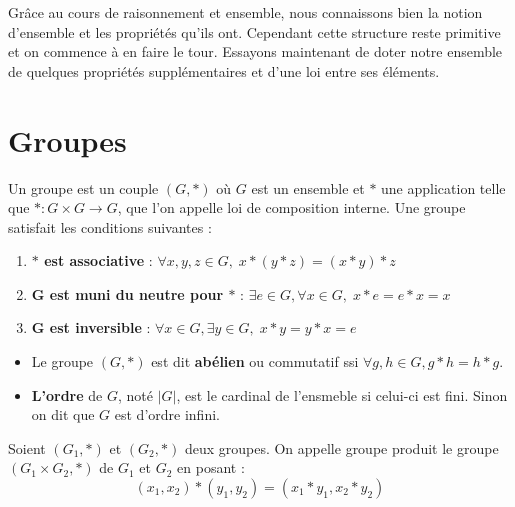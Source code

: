 
Grâce au cours de raisonnement et ensemble, nous connaissons bien la notion d'ensemble et les propriétés qu'ils ont. 
Cependant cette structure reste primitive et on commence à en faire le tour. 
Essayons maintenant de doter notre ensemble de quelques propriétés supplémentaires et d'une loi entre ses éléments. 


\section{Groupes}

\begin{definition}[Groupe]
    Un groupe est un couple $(G,*)$ où $G$ est un ensemble et $*$ une application telle que $* : G \times G \rightarrow G$, que l'on appelle loi de composition interne.
    Une groupe satisfait les conditions suivantes :
    \begin{enumerate}
        \item \textbf{$*$ est associative} : $ \forall x, y, z \in G, \; x * (y * z) = (x * y) * z $
        \item \textbf{G est muni du neutre pour $*$} : $ \exists e \in G, \forall x \in G, \; x * e = e * x = x $ 
        \item \textbf{G est inversible} : $ \forall x \in G, \exists y \in G, \; x * y = y * x = e $
    \end{enumerate}
\end{definition}

\begin{remark}
    \begin{itemize}
        \item Le groupe $(G,*)$ est dit \textbf{abélien} ou commutatif ssi $ \forall g,h \in G, g*h = h*g $.
        \item \textbf{L'ordre} de $G$, noté $|G|$, est le cardinal de l'ensmeble si celui-ci est fini. Sinon on dit que $G$ est d'ordre infini.
    \end{itemize}
\end{remark}

\begin{definition}
    Soient $(G_1, *)$ et $(G_2, *)$ deux groupes. On appelle groupe produit le groupe $(G_1 \times G_2, *)$ de $G_1$ et $G_2$ en posant : \[ (x_1, x_2) * (y_1, y_2) = (x_1 * y_1, x_2 * y_2) \]
\end{definition}


